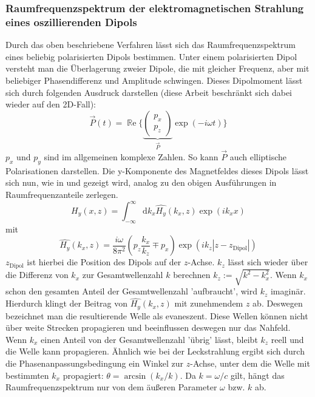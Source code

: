 \documentclass[titlepage,  ngerman]{article}
\renewcommand{\Re}{\operatorname{\mathbb{R}e}}
\begin{document}
	\subsubsection{Raumfrequenzspektrum der elektromagnetischen Strahlung eines oszillierenden Dipols}
	\label{sec:spatial_freq_dip}
	Durch das oben beschriebene Verfahren lässt sich das Raumfrequenzspektrum eines beliebig polarisierten Dipols bestimmen. Unter einem polarisierten Dipol versteht man die Überlagerung zweier Dipole, die mit gleicher Frequenz, aber mit beliebiger Phasendifferenz und Amplitude schwingen. Dieses Dipolmoment lässt sich durch folgenden Ausdruck darstellen (diese Arbeit beschränkt sich dabei wieder auf den 2D-Fall): 
	$$\vec{P}(t)= \Re\biggl\{\underbrace{\begin{pmatrix} p_x \\ p_z \end{pmatrix}}_{\vec{P}} \exp(-i\omega t)\biggr\} $$
	$p_x$ und $p_y$ sind im allgemeinen komplexe Zahlen. So kann $\vec{P}$ auch elliptische Polarisationen darstellen. Die y-Komponente des Magnetfeldes dieses Dipols lässt sich nun, wie in \cite{Novotny.2012b} und \cite{RodriguezFortuno.2013} gezeigt wird, analog zu den obigen Ausführungen in Raumfrequenzanteile zerlegen.
	\begin{equation}
		H_y(x, z) = \int_{-\infty}^{\infty}\mathrm{d}k_x\hat{H_y}(k_x, z)\exp(ik _xx) 
	\end{equation}
	mit
	\begin{equation}
		\label{eq:spatial_freq_dip}
		\boxed{\hat{H_y}(k_x, z) = \dfrac{i\omega}{8\pi^2}\left(p_z\dfrac{k_x}{k_z} \mp p_x\right)\exp(ik_z|z-z_{\mathrm{Dipol}}|)}
	\end{equation}
	$z_{\mathrm{Dipol}}$ ist hierbei die Position des Dipols auf der $z$-Achse. $k_z$ lässt sich wieder über die Differenz von $k_x$ zur Gesamtwellenzahl $k$ berechnen $k_z := \sqrt{k^2-k_x^2}$. Wenn $k_x$ schon den gesamten Anteil der Gesamtwellenzahl 'aufbraucht',  wird $k_z$ imaginär. Hierdurch klingt der Beitrag von $\hat{H_y}(k_x, z)$ mit zunehmendem $z$ ab. Deswegen bezeichnet man die resultierende Welle als evaneszent. Diese Wellen können nicht über weite Strecken propagieren und beeinflussen deswegen nur das Nahfeld. Wenn $k_x$ einen Anteil von der Gesamtwellenzahl 'übrig' lässt, bleibt $k_z$ reell und die Welle kann propagieren. Ähnlich wie bei der Leckstrahlung ergibt sich durch die Phasenanpassungsbedingung ein Winkel zur $z$-Achse, unter dem die Welle mit bestimmten $k_x$ propagiert: $\theta = \arcsin(k_x/k)$. Da $k = \omega / c$ gilt, hängt das Raumfrequenzspektrum nur von dem äußeren Parameter $\omega$ bzw. $k$ ab. 
\end{document}
